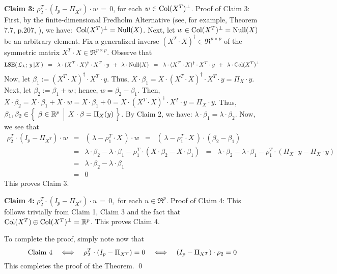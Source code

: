 \vskip 0.5cm
\noindent
\textbf{Claim 3:}\quad
$\rho_{2}^{T} \cdot (I_{p} - \Pi_{X^{T}}) \cdot w \,=\, 0$,
for each $w \in \textnormal{Col}(X^{T})^{\perp}$.
\vskip 0.2cm
\noindent
Proof of Claim 3:\quad
First, by the finite-dimensional Fredholm Alternative (see, for example, Theorem 7.7, p.207, \cite{Axler2015}),
we have: \,$\textnormal{Col}(X^{T})^{\perp} = \textnormal{Null}(X)$.
Next, let $w \in \textnormal{Col}(X^{T})^{\perp} = \textnormal{Null}(X)$ be an arbitrary element.
Fix a generalized inverse $(X^{T} \cdot X)^{\dagger} \in \Re^{p \times p}$
of the symmetric matrix $X^{T} \cdot X \in \Re^{p \times p}$.
Observe that
\begin{equation*}
\textnormal{LSE}\!\left(\,\mathcal{L}_{\lambda}\,;\,y\,\vert X\,\right)
\;\; = \;\;
	\lambda \cdot (X^{T} \cdot X)^{\dagger} \cdot X^{T} \cdot y \;\, + \;\, \lambda \cdot \textnormal{Null}(X)
\;\; = \;\;
	\lambda \cdot (X^{T} \cdot X)^{\dagger} \cdot X^{T} \cdot y \;\, + \;\, \lambda \cdot \textnormal{Col}(X^{T})^{\perp}
\end{equation*}
Now, let $\beta_{1} := (X^{T} \cdot X)^{\dagger} \cdot X^{T} \cdot y$.
Thus, $X\cdot\beta_{1} = X \cdot (X^{T} \cdot X)^{\dagger} \cdot X^{T} \cdot y = \Pi_{X}\cdot y$.
Next, let $\beta_{2} := \beta_{1} + w$\,; hence, $w = \beta_{2} - \beta_{1}$.
Then, $X\cdot\beta_{2} = X\cdot\beta_{1} + X\cdot w = X\cdot\beta_{1} + 0 = X \cdot (X^{T} \cdot X)^{\dagger} \cdot X^{T} \cdot y = \Pi_{X}\cdot y$.
Thus, $\beta_{1}, \beta_{2} \in \left\{\;\left.\overset{{\color{white}.}}{\beta} \in \Re^{p} \;\,\right\vert\; X\cdot\beta=\Pi_{X}(y) \;\right\}$.
By Claim 2, we have: $\lambda\cdot\beta_{1} = \lambda\cdot\beta_{2}$.
Now, we see that
\begin{eqnarray*}
\rho_{2}^{T} \cdot (I_{p} - \Pi_{X^{T}}) \cdot w
&=&
	\left(\, \lambda - \rho_{1}^{T} \cdot X \,\right) \cdot w
\;\; = \;\;
	\left(\, \lambda - \rho_{1}^{T} \cdot X \,\right) \cdot (\beta_{2} - \beta_{1})
\\
&=&
	\lambda\cdot\beta_{2} - \lambda\cdot\beta_{1} - \rho_{1}^{T} \cdot (X \cdot \beta_{2} - X \cdot \beta_{1})
\;\; = \;\;
	\lambda\cdot\beta_{2} - \lambda\cdot\beta_{1} - \rho_{1}^{T} \cdot (\Pi_{X}\cdot y - \Pi_{X}\cdot y)
\\
&=&
	\lambda\cdot\beta_{2} - \lambda\cdot\beta_{1}
\\
&=&
	0
\end{eqnarray*}
This proves Claim 3.

\vskip 0.5cm
\noindent
\textbf{Claim 4:}\quad
$\rho_{2}^{T} \cdot (I_{p} - \Pi_{X^{T}}) \cdot u \,=\, 0$,\, for each $u \in \Re^{p}$.
\vskip 0.2cm
\noindent
Proof of Claim 4:\quad
This follows trivially from Claim 1, Claim 3 and the fact that
$\textnormal{Col}(X^{T}) \oplus \textnormal{Col}(X^{T})^{\perp} = \mathbb{R}^{p}$.
This proves Claim 4.

\vskip 0.5cm
\noindent
To complete the proof, simply note now that
\begin{equation*}
\textnormal{Claim 4}
\quad\Longleftrightarrow\quad
	\rho_{2}^{T} \cdot (I_{p} - \Pi_{X^{T}}) = 0
\quad\Longleftrightarrow\quad
	(I_{p} - \Pi_{X^{T}}) \cdot \rho_{2} = 0
\end{equation*}
This completes the proof of the Theorem.
\qed

